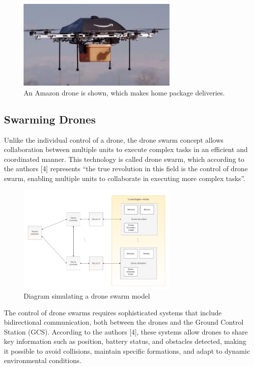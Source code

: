\begin{figure}
    \centering
    \includegraphics[width=0.7\textwidth]{pictures/drone_aplication_2.jpg}
    \caption{An Amazon drone is shown, which makes home package deliveries. \cite{aplications_drones}}
    \label{fig:drone_applications_2}
\end{figure}

\subsection{Swarming Drones}
Unlike the individual control of a drone, the drone swarm concept allows collaboration between multiple units to execute complex tasks in an efficient and coordinated manner. This technology is called drone swarm, which according to the authors [4] represents “the true revolution in this field is the control of drone swarm, enabling multiple units to collaborate in executing more complex tasks”. 

\begin{figure}
    \centering
    \includegraphics[width=0.7\textwidth]{pictures/swarm_diagram.png}
    \caption{Diagram simulating a drone swarm model}
    \label{fig:swarming_drones}
\end{figure}

The control of drone swarms requires sophisticated systems that include bidirectional communication, both between the drones and the Ground Control Station (GCS). According to the authors [4], these systems allow drones to share key information such as position, battery status, and obstacles detected, making it possible to avoid collisions, maintain specific formations, and adapt to dynamic environmental conditions.

